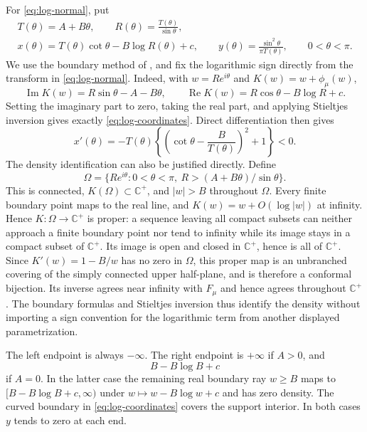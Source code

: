 \documentclass[11pt,a4paper]{article}
\theoremstyle{definition}
\theoremstyle{remark}
\numberwithin{equation}{section}
\newcommand{\Cplus}{\mathbb{C}^{+}}
\begin{document}
For \eqref{eq:log-normal}, put
\begin{equation}\label{eq:log-coordinates}
 \begin{gathered}
 T(\theta)=A+B\theta,\qquad
 R(\theta)=\frac{T(\theta)}{\sin\theta},\\
 x(\theta)=T(\theta)\cot\theta-B\log R(\theta)+c,\qquad
 y(\theta)=\frac{\sin^2\theta}{\pi T(\theta)},\qquad 0<\theta<\pi.
 \end{gathered}
\end{equation}
We use the boundary method of \cite[Appendix, Proposition A1.3]{BP},
and fix the logarithmic sign directly from the transform in
\eqref{eq:log-normal}. Indeed, with $w=Re^{i\theta}$ and
$K(w)=w+\phi_\mu(w)$,
\[
 \operatorname{Im}K(w)=R\sin\theta-A-B\theta,\qquad
 \operatorname{Re}K(w)=R\cos\theta-B\log R+c .
\]
Setting the imaginary part to zero, taking the real part, and applying
Stieltjes inversion gives exactly \eqref{eq:log-coordinates}.
Direct differentiation then gives
\begin{equation}\label{eq:log-xprime}
 x'(\theta)=
 -T(\theta)\left\{\left(\cot\theta-\frac{B}{T(\theta)}\right)^2+1\right\}
 <0.
\end{equation}
The density identification can also be justified directly. Define
\[
 \Omega=\{Re^{i\theta}:0<\theta<\pi,\ 
                   R>(A+B\theta)/\sin\theta\}.
\]
This is connected, $K(\Omega)\subset\Cplus$, and
$|w|>B$ throughout $\Omega$. Every finite boundary point maps to the
real line, and $K(w)=w+O(\log|w|)$ at infinity. Hence
$K:\Omega\to\Cplus$ is proper: a sequence leaving all compact
subsets can neither approach a finite boundary point nor tend to
infinity while its image stays in a compact subset of $\Cplus$.
Its image is open and closed in $\Cplus$, hence is all of $\Cplus$.
Since $K'(w)=1-B/w$ has no zero in $\Omega$, this proper map is an
unbranched covering of the simply connected upper half-plane, and is
therefore a conformal bijection. Its inverse agrees near infinity
with $F_\mu$ and hence agrees throughout $\Cplus$.
The boundary formulas and Stieltjes inversion thus identify the
density without importing a sign convention for the logarithmic
term from another displayed parametrization.

The left endpoint is always $-\infty$. The right endpoint is
$+\infty$ if $A>0$, and
\begin{equation}\label{eq:log-edge}
 B-B\log B+c
\end{equation}
if $A=0$. In the latter case the remaining real boundary ray $w\ge B$
maps to $[B-B\log B+c,\infty)$ under
$w\mapsto w-B\log w+c$ and has zero density.
The curved boundary in \eqref{eq:log-coordinates} covers the support
interior. In both cases $y$ tends to zero at each end.
\end{document}
